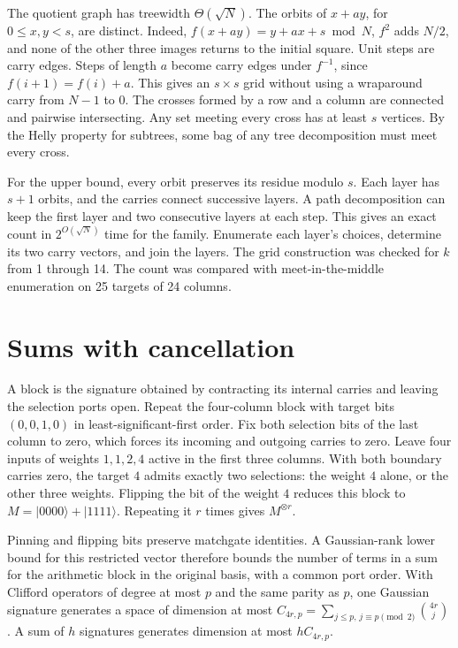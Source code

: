 \documentclass[11pt,a4paper]{article}
\numberwithin{equation}{section}
\begin{document}
The quotient graph has treewidth \(\Theta(\sqrt N)\). The orbits of \(x+ay\), for \(0\le x,y<s\), are distinct. Indeed, \(f(x+ay)=y+ax+s\bmod N\), \(f^2\) adds \(N/2\), and none of the other three images returns to the initial square. Unit steps are carry edges. Steps of length \(a\) become carry edges under \(f^{-1}\), since \(f(i+1)=f(i)+a\). This gives an \(s\times s\) grid without using a wraparound carry from \(N-1\) to \(0\). The crosses formed by a row and a column are connected and pairwise intersecting. Any set meeting every cross has at least \(s\) vertices. By the Helly property for subtrees, some bag of any tree decomposition must meet every cross.

For the upper bound, every orbit preserves its residue modulo \(s\). Each layer has \(s+1\) orbits, and the carries connect successive layers. A path decomposition can keep the first layer and two consecutive layers at each step. This gives an exact count in \(2^{O(\sqrt N)}\) time for the family. Enumerate each layer's choices, determine its two carry vectors, and join the layers. The grid construction was checked for \(k\) from 1 through 14. The count was compared with meet-in-the-middle enumeration on 25 targets of 24 columns.

\section{Sums with cancellation}\label{sums-with-cancellation}

A block is the signature obtained by contracting its internal carries and leaving the selection ports open. Repeat the four-column block with target bits \((0,0,1,0)\) in least-significant-first order. Fix both selection bits of the last column to zero, which forces its incoming and outgoing carries to zero. Leave four inputs of weights \(1,1,2,4\) active in the first three columns. With both boundary carries zero, the target \(4\) admits exactly two selections: the weight \(4\) alone, or the other three weights. Flipping the bit of the weight \(4\) reduces this block to \(M=|0000\rangle+|1111\rangle\). Repeating it \(r\) times gives \(M^{\otimes r}\).

Pinning and flipping bits preserve matchgate identities. A Gaussian-rank lower bound for this restricted vector therefore bounds the number of terms in a sum for the arithmetic block in the original basis, with a common port order. With Clifford operators of degree at most \(p\) and the same parity as \(p\), one Gaussian signature generates a space of dimension at most \(C_{4r,p}=\sum_{j\le p,\,j\equiv p\pmod 2}\binom{4r}{j}\). A sum of \(h\) signatures generates dimension at most \(hC_{4r,p}\).
\end{document}
